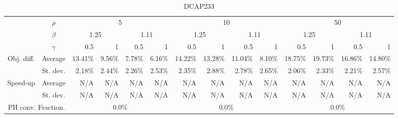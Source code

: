 \documentclass[preprint, 1p, review]{elsarticle}
\begin{document}
 \begin{table}[htbp]
   \centering
   \tiny
     \begin{tabular}{ccrrrrrrrrrrrr}
     \toprule
     \multirow{3}[6]{*}{} & $\rho$ & \multicolumn{4}{c}{5} & \multicolumn{4}{c}{10} & \multicolumn{4}{c}{50} \\
     
        & $\beta$ & \multicolumn{2}{c}{1.25} & \multicolumn{2}{c}{1.11} & \multicolumn{2}{c}{1.25} & \multicolumn{2}{c}{1.11} & \multicolumn{2}{c}{1.25} & \multicolumn{2}{c}{1.11} \\
        & $\gamma$ & 0.5 & 1  & 0.5 & 1  & 0.5 & 1  & 0.5 & 1  & 0.5 & 1  & 0.5 & 1 \\ \midrule
     \multirow{2}[4]{*}{Obj. diff.} & Average & 13.41\% & 9.56\% & 7.78\% & 6.16\% & 14.22\% & 13.28\% & 11.04\% & 8.10\% & 18.75\% & 19.73\% & 16.86\% & 14.80\% \\
        & St. dev. & 2.18\% & 2.44\% & 2.26\% & 2.53\% & 2.35\% & 2.88\% & 2.78\% & 2.65\% & 2.06\% & 2.33\% & 2.21\% & 2.57\% \\
     \multirow{2}[4]{*}{Speed-up} & Average & N/A & N/A & N/A & N/A & N/A & N/A & N/A & N/A & N/A & N/A & N/A & N/A \\
        & St. dev. & N/A & N/A & N/A & N/A & N/A & N/A & N/A & N/A & N/A & N/A & N/A & N/A \\
     \multicolumn{2}{c}{PH conv. Fraction.} & \multicolumn{4}{c}{0.0\%} & \multicolumn{4}{c}{0.0\%} & \multicolumn{4}{c}{0.0\%} \\
     \bottomrule
     \end{tabular}%
   \label{tab:App3}%
   \caption{DCAP233}         
 \end{table}%
% 
\end{document}
